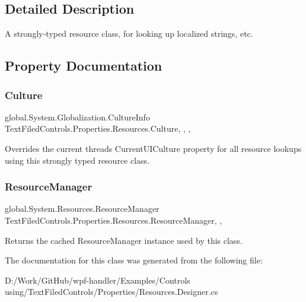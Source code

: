 \subsection{Detailed Description}
A strongly-\/typed resource class, for looking up localized strings, etc. 



\subsection{Property Documentation}
\mbox{\label{class_text_filed_controls_1_1_properties_1_1_resources_aec332738d182cad482fc22aa0899fdc6}} 
\subsubsection{\texorpdfstring{Culture}{Culture}}
{\footnotesize\ttfamily global.\+System.\+Globalization.\+Culture\+Info Text\+Filed\+Controls.\+Properties.\+Resources.\+Culture\hspace{0.3cm}{\ttfamily [static]}, {\ttfamily [get]}, {\ttfamily [set]}, {\ttfamily [package]}}



Overrides the current thread\textquotesingle{}s Current\+U\+I\+Culture property for all resource lookups using this strongly typed resource class. 

\mbox{\label{class_text_filed_controls_1_1_properties_1_1_resources_ac25cf729078bfb32ba5aa10c9286a40c}} 
\subsubsection{\texorpdfstring{Resource\+Manager}{ResourceManager}}
{\footnotesize\ttfamily global.\+System.\+Resources.\+Resource\+Manager Text\+Filed\+Controls.\+Properties.\+Resources.\+Resource\+Manager\hspace{0.3cm}{\ttfamily [static]}, {\ttfamily [get]}, {\ttfamily [package]}}



Returns the cached Resource\+Manager instance used by this class. 



The documentation for this class was generated from the following file\+:\begin{DoxyCompactItemize}
\item 
D\+:/\+Work/\+Git\+Hub/wpf-\/handler/\+Examples/\+Controls using/\+Text\+Filed\+Controls/\+Properties/Resources.\+Designer.\+cs\end{DoxyCompactItemize}

